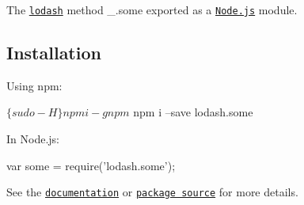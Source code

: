 The \href{https://lodash.com/}{\tt lodash} method {\ttfamily \+\_\+.\+some} exported as a \href{https://nodejs.org/}{\tt Node.\+js} module.

\subsection*{Installation}

Using npm\+: 
\begin{DoxyCode}
$ \{sudo -H\} npm i -g npm
$ npm i --save lodash.some
\end{DoxyCode}


In Node.\+js\+: 
\begin{DoxyCode}
var some = require('lodash.some');
\end{DoxyCode}


See the \href{https://lodash.com/docs#some}{\tt documentation} or \href{https://github.com/lodash/lodash/blob/4.6.0-npm-packages/lodash.some}{\tt package source} for more details. 